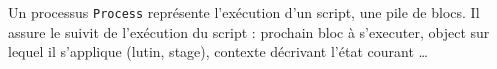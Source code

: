 % 
% 
% 
% 
% 

Un processus \texttt{Process} représente l'exécution d'un script, une pile de blocs. Il assure le suivit de l'exécution du script : prochain bloc à s'executer, object sur lequel il s'applique (lutin, stage), contexte décrivant l'état courant \ldots

